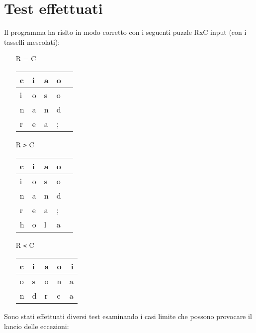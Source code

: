 \documentclass{article}
\begin{document}
\section{Test effettuati}
Il programma ha rislto in modo corretto con i seguenti puzzle RxC input (con i tasselli mescolati):
\begin{itemize}

\item[R = C] 
\begin{tabular}{l|l|l|l|r|}
\hline
c & i & a & o \\
\hline
i & o & s & o \\
\hline
n & a & n & d \\
\hline
r  & e & a & ; \\
\hline
\end{tabular}

\item[R \texttt{>} C]
\begin{tabular}{l|l|l|l|r|}
\hline
c & i & a & o \\
\hline
i & o & s & o \\
\hline
n & a & n & d \\
\hline
r  & e & a & ; \\
\hline
h  & o & l & a \\
\hline
\end{tabular}

\item[R \texttt{<} C]
\begin{tabular}{l|l|l|l|r|}
\hline
c & i & a  & o & i \\
\hline
o & s & o & n & a  \\
\hline
n & d & r & e & a \\
\hline
\end{tabular}

\end{itemize}
Sono stati effettuati diversi test esaminando i casi limite che possono provocare il lancio delle eccezioni:
\end{document}
